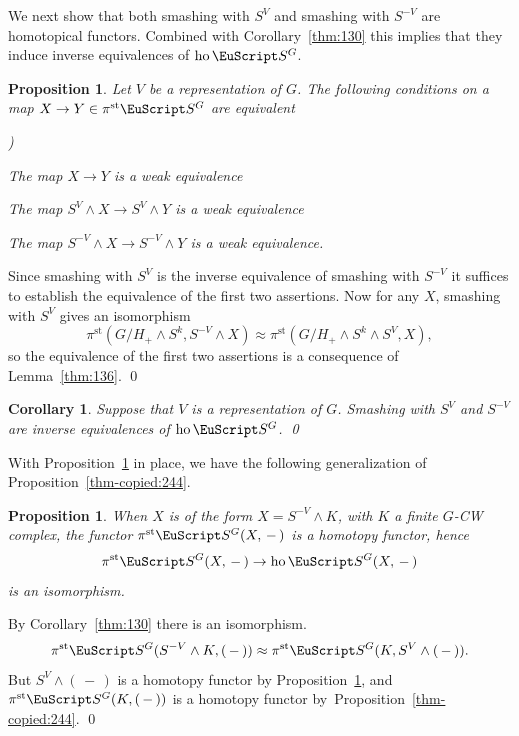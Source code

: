 \documentclass{amsart}
\newtheorem{cor}[equation]{Corollary}
\newtheorem{prop}[equation]{Proposition}
\theoremstyle{definition}
\theoremstyle{remark}
\newenvironment{pf}{\bigskip{\em Proof:\/}}{\qed\medskip}
\newcounter{thmItem}
\newenvironment{thmList}{\begin{list}%
{\rm \roman{thmItem})}{\usecounter{thmItem}
\setlength{\labelwidth}{2em}
\setlength{\itemindent}{2em}
\setlength{\leftmargin}{0pt}
\setlength{\listparindent}{0pt}
\setlength{\parsep}{0pt}
\setlength{\partopsep}{0pt}
\setlength{\itemsep}{\medskipamount}
\setlength{\topsep}{\medskipamount}
}}{\end{list}}
\newcommand{\slot}{\,-\,}
\newcommand{\spectra}{\EuScript S}
\DeclareMathOperator{\ho}{ho}
\newcommand{\ugspectra}[1]{\spectra^{#1}}
\newcommand{\pist}{\pi^{\text{st}}}
\begin{document}
We next show that both smashing with $S^{V}$ and smashing with $S^{-V}$
are homotopical functors.   Combined with Corollary~\ref{thm:130} this
implies that they induce inverse equivalences of $\ho\ugspectra{G}$.

\begin{prop}
\label{thm-copied:254}
Let $V$ be a representation of $G$.   The following conditions on a
map $X\to Y\in\pist\ugspectra{G}$ are equivalent
\begin{thmList}
\item  The map $X\to Y$ is a weak 
equivalence
\item  The map $S^{V}\wedge X\to S^{V}\wedge Y$ is a weak equivalence
\item The map $S^{-V}\wedge X\to S^{-V}\wedge Y$ is a weak equivalence.
\end{thmList}
\end{prop}

\begin{pf}
Since smashing with $S^{V}$ is the inverse equivalence of smashing
with $S^{-V}$ it suffices to establish the equivalence of the first
two assertions.  Now for any $X$, smashing with $S^{V}$ gives an
isomorphism
\[
\pist(G/H_{+}\wedge S^{k},S^{-V}\wedge X) \approx\pist(G/H_{+}\wedge
S^{k}\wedge S^{V},X),
\]
so the equivalence of the first two assertions is a consequence of Lemma~\ref{thm:136}.
\end{pf}

\begin{cor}
\label{thm:160}
Suppose that $V$ is a representation of $G$.   Smashing with $S^{V}$
and $S^{-V}$ are inverse equivalences of $\ho\ugspectra{G}$. \qed
\end{cor}

With Proposition~\ref{thm-copied:254} in place, we have the following
generalization of Proposition~\ref{thm-copied:244}.

\begin{prop}
\label{thm:161} When $X$ is of the form $X=S^{-V}\wedge K$, with $K$ a
finite $G$-CW complex, the functor $\pist\ugspectra{G}(X,\slot)$ is a
homotopy functor, hence 
\[
\pist\ugspectra{G}(X,\slot)\to
\ho\ugspectra{G}(X,\slot)
\]
is an isomorphism.
\end{prop}

\begin{pf}
By Corollary~\ref{thm:130} there is  an isomorphism.
\[
\pist\ugspectra{G}(S^{-V}\wedge K, (\slot)) \approx
\pist\ugspectra{G}(K, S^{V}\wedge (\slot)).
\]
But $S^{V}\wedge (\slot)$ is a homotopy functor by
Proposition~\ref{thm-copied:254}, and $\pist\ugspectra{G}(K,
(\slot))$ is a homotopy functor by~Proposition~\ref{thm-copied:244}. 
\end{pf}
\end{document}
